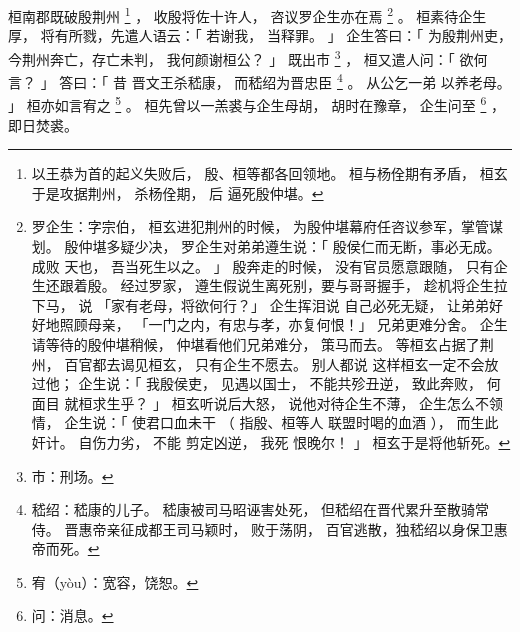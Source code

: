 
\switchcolumn*[\section{}]

桓南郡既破殷荆州%
\footnote{%
    以王恭为首的起义失败后，
    殷、桓等都各回领地。
    桓与杨佺期有矛盾，
    桓玄于是攻据荆州，
    杀杨佺期，
    后
    逼死殷仲堪。
}%
，
收殷将佐十许人，
咨议罗企生亦在焉%
\footnote{%
    罗企生：字宗伯，
            桓玄进犯荆州的时候，
            为殷仲堪幕府任咨议参军，掌管谋划。
            殷仲堪多疑少决，
            罗企生对弟弟遵生说：「
                殷侯仁而无断，事必无成。
                成败
                天也，
                吾当死生以之。
            」
            殷奔走的时候，
            没有官员愿意跟随，
            只有企生还跟着殷。
            经过罗家，
            遵生假说生离死别，要与哥哥握手，
            趁机将企生拉下马，
            说
            「家有老母，将欲何行？」
            企生挥泪说
            自己必死无疑，
            让弟弟好好地照顾母亲，
            「一门之内，有忠与孝，亦复何恨！」
            兄弟更难分舍。
            企生请等待的殷仲堪稍候，
            仲堪看他们兄弟难分，
            策马而去。
            等桓玄占据了荆州，
            百官都去谒见桓玄，
            只有企生不愿去。
            别人都说
            这样桓玄一定不会放过他；
            企生说：「
                我殷侯吏，
                见遇以国士，
                不能共殄丑逆，
                致此奔败，
                何面目
                就桓求生乎？
            」
            桓玄听说后大怒，
            说他对待企生不薄，
            企生怎么不领情，
            企生说：「
                使君口血未干
                （
                    指殷、桓等人
                    联盟时喝的血酒
                ），
                而生此奸计。
                自伤力劣，
                不能
                剪定凶逆，
                我死
                恨晚尔！
            」
            桓玄于是将他斩死。
}%
。
桓素待企生厚，
将有所戮，先遣人语云：「
    若谢我，
    当释罪。
」
企生答曰：「
    为殷荆州吏，
    今荆州奔亡，存亡未判，
    我何颜谢桓公？
」
既出市%
\footnote{%
    市：刑场。
}%
，
桓又遣人问：「
    欲何言？
」
答曰：「
    昔
    晋文王杀嵇康，
    而嵇绍为晋忠臣%
    \footnote{%
        嵇绍：嵇康的儿子。
              嵇康被司马昭诬害处死，
              但嵇绍在晋代累升至散骑常侍。
              晋惠帝亲征成都王司马颖时，
              败于荡阴，
              百官逃散，独嵇绍以身保卫惠帝而死。
    }%
    。
    从公乞一弟
    以养老母。
」
桓亦如言宥之%
\footnote{%
    宥（yòu）：宽容，饶恕。
}%
。
桓先曾以一羔裘与企生母胡，
胡时在豫章，
企生问至%
\footnote{%
    问：消息。
}%
，即日焚裘。

